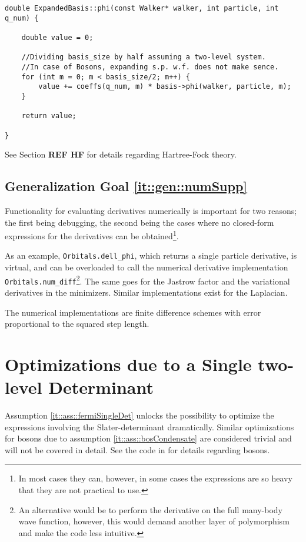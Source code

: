 \vspace{0.5cm}
\begin{lstlisting}
double ExpandedBasis::phi(const Walker* walker, int particle, int q_num) {

    double value = 0;
    
    //Dividing basis_size by half assuming a two-level system.
    //In case of Bosons, expanding s.p. w.f. does not make sence.
    for (int m = 0; m < basis_size/2; m++) {
        value += coeffs(q_num, m) * basis->phi(walker, particle, m);
    }

    return value;

}
\end{lstlisting}

See Section \textbf{REF HF} for details regarding Hartree-Fock theory.

\subsection{Generalization Goal \ref{it::gen::numSupp}}

Functionality for evaluating derivatives numerically is important for two reasons; the first being debugging, the second being the cases where no closed-form expressions for the derivatives can be obtained\footnote{In most cases they can, however, in some cases the expressions are so heavy that they are not practical to use.}.

As an example, \verb+Orbitals.dell_phi+, which returns a single particle derivative, is virtual, and can be overloaded to call the numerical derivative implementation \verb+Orbitals.num_diff+\footnote{An alternative would be to perform the derivative on the full many-body wave function, however, this would demand another layer of polymorphism and make the code less intuitive.}. The same goes for the Jastrow factor and the variational derivatives in the minimizers. Similar implementations exist for the Laplacian.

The numerical implementations are finite difference schemes with error proportional to the squared step length.

\section{Optimizations due to a Single two-level Determinant}

Assumption \ref{it::ass::fermiSingleDet} unlocks the possibility to optimize the expressions involving the Slater-determinant dramatically. Similar optimizations for bosons due to assumption \ref{it::ass::bosCondensate} are considered trivial and will not be covered in detail. See the code in \cite{libBorealisCode} for details regarding bosons.

